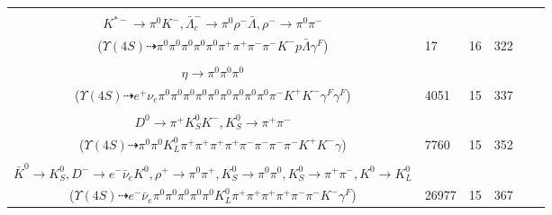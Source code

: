 \documentclass[landscape]{article}
\newcounter{rownumbers}
\newcommand\rn{\stepcounter{rownumbers}\arabic{rownumbers}}
\newcommand{\EOLP}{\\ \hline} %
\newcommand{\topoTags}[1]{#1} %
\begin{document}
\begin{longtable}{clcccc}
\rn & \makecell[l]{ $ 
\Upsilon(4S) \rightarrow B^{0} \bar{B}^{0} ,
B^{0} \rightarrow \rho^{-} \Delta^{+} \bar{\Sigma}_{c}^{0} ,
\bar{B}^{0} \rightarrow \pi^{+} K^{*-} \gamma^{F} ,
\rho^{-} \rightarrow \pi^{0} \pi^{-} ,
\Delta^{+} \rightarrow \pi^{0} p ,
\bar{\Sigma}_{c}^{0} \rightarrow \pi^{+} \bar{\Lambda}_{c}^{-} ,
$ \\ $
K^{*-} \rightarrow \pi^{0} K^{-} ,
\bar{\Lambda}_{c}^{-} \rightarrow \pi^{0} \rho^{-} \bar{\Lambda} ,
\rho^{-} \rightarrow \pi^{0} \pi^{-} 
$ \\ ($
\Upsilon(4S) \dashrightarrow \pi^{0} \pi^{0} \pi^{0} \pi^{0} \pi^{0} \pi^{+} \pi^{+} \pi^{-} \pi^{-} K^{-} p \bar{\Lambda} \gamma^{F} 
$) } & \topoTags{17 & }16 & 322 \EOLP

\rn & \makecell[l]{ $ 
\Upsilon(4S) \rightarrow B^{0} \bar{B}^{0} ,
B^{0} \rightarrow e^{+} \nu_{e} D_{1}^{-} \gamma^{F} \gamma^{F} ,
\bar{B}^{0} \rightarrow K^{+} K_{0}^{*-} ,
D_{1}^{-} \rightarrow \pi^{0} \pi^{0} D^{-} ,
K_{0}^{*-} \rightarrow \pi^{0} K^{-} ,
D^{-} \rightarrow \pi^{0} \pi^{0} \pi^{0} \pi^{-} \eta ,
$ \\ $
\eta \rightarrow \pi^{0} \pi^{0} \pi^{0} 
$ \\ ($
\Upsilon(4S) \dashrightarrow e^{+} \nu_{e} \pi^{0} \pi^{0} \pi^{0} \pi^{0} \pi^{0} \pi^{0} \pi^{0} \pi^{0} \pi^{0} \pi^{-} K^{+} K^{-} \gamma^{F} \gamma^{F} 
$) } & \topoTags{4051 & }15 & 337 \EOLP

\rn & \makecell[l]{ $ 
\Upsilon(4S) \rightarrow B^{0} \bar{B}^{0} ,
B^{0} \rightarrow \pi^{-} K_{0}^{*+} ,
\bar{B}^{0} \rightarrow \pi^{0} \pi^{+} \pi^{+} \pi^{-} \pi^{-} \bar{K}^{0} D^{*0} ,
K_{0}^{*+} \rightarrow \pi^{0} K^{+} ,
\bar{K}^{0} \rightarrow K_{L}^{0} ,
D^{*0} \rightarrow D^{0} \gamma ,
$ \\ $
D^{0} \rightarrow \pi^{+} K_{S}^{0} K^{-} ,
K_{S}^{0} \rightarrow \pi^{+} \pi^{-} 
$ \\ ($
\Upsilon(4S) \dashrightarrow \pi^{0} \pi^{0} K_{L}^{0} \pi^{+} \pi^{+} \pi^{+} \pi^{+} \pi^{-} \pi^{-} \pi^{-} \pi^{-} K^{+} K^{-} \gamma 
$) } & \topoTags{7760 & }15 & 352 \EOLP

\rn & \makecell[l]{ $ 
\Upsilon(4S) \rightarrow B^{0} \bar{B}^{0} ,
B^{0} \rightarrow \rho^{+} \omega K^{0} \bar{K}^{0} D^{-} ,
\bar{B}^{0} \rightarrow \rho^{+} K^{-} \gamma^{F} ,
\rho^{+} \rightarrow \pi^{0} \pi^{+} ,
\omega \rightarrow \pi^{0} \pi^{+} \pi^{-} ,
K^{0} \rightarrow K_{S}^{0} ,
$ \\ $
\bar{K}^{0} \rightarrow K_{S}^{0} ,
D^{-} \rightarrow e^{-} \bar{\nu}_{e} K^{0} ,
\rho^{+} \rightarrow \pi^{0} \pi^{+} ,
K_{S}^{0} \rightarrow \pi^{0} \pi^{0} ,
K_{S}^{0} \rightarrow \pi^{+} \pi^{-} ,
K^{0} \rightarrow K_{L}^{0} 
$ \\ ($
\Upsilon(4S) \dashrightarrow e^{-} \bar{\nu}_{e} \pi^{0} \pi^{0} \pi^{0} \pi^{0} \pi^{0} K_{L}^{0} \pi^{+} \pi^{+} \pi^{+} \pi^{+} \pi^{-} \pi^{-} K^{-} \gamma^{F} 
$) } & \topoTags{26977 & }15 & 367 \EOLP


\end{longtable}
\end{document}
